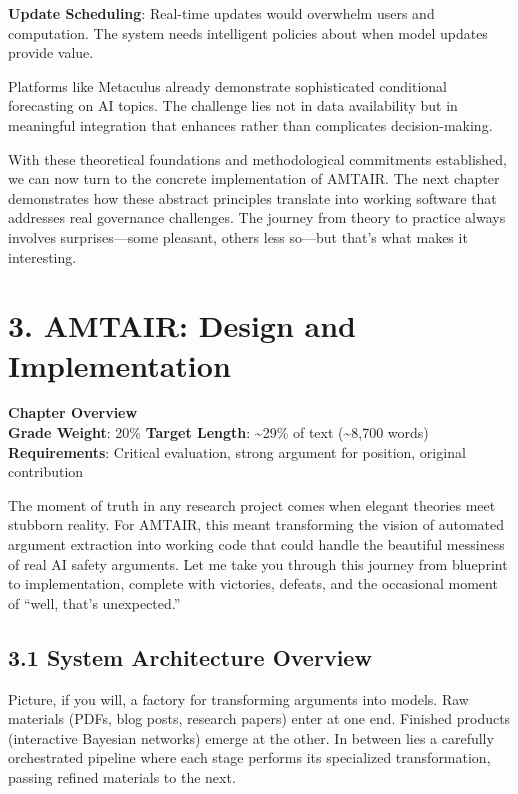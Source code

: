 \documentclass[
  11pt,
  letterpaper,
]{book}
\begin{document}
\textbf{Update Scheduling}: Real-time updates would overwhelm users and
computation. The system needs intelligent policies about when model
updates provide value.

Platforms like Metaculus \textcite{tetlock2022} already demonstrate
sophisticated conditional forecasting on AI topics. The challenge lies
not in data availability but in meaningful integration that enhances
rather than complicates decision-making.

With these theoretical foundations and methodological commitments
established, we can now turn to the concrete implementation of AMTAIR.
The next chapter demonstrates how these abstract principles translate
into working software that addresses real governance challenges. The
journey from theory to practice always involves surprises---some
pleasant, others less so---but that's what makes it interesting.


\chapter{3. AMTAIR: Design and Implementation}\label{sec-amtair}

\textbf{Chapter Overview}\\
\textbf{Grade Weight}: 20\% \textbar{} \textbf{Target Length}:
\textasciitilde29\% of text (\textasciitilde8,700 words)\\
\textbf{Requirements}: Critical evaluation, strong argument for
position, original contribution

The moment of truth in any research project comes when elegant theories
meet stubborn reality. For AMTAIR, this meant transforming the vision of
automated argument extraction into working code that could handle the
beautiful messiness of real AI safety arguments. Let me take you through
this journey from blueprint to implementation, complete with victories,
defeats, and the occasional moment of ``well, that's unexpected.''

\section{3.1 System Architecture
Overview}\label{sec-system-architecture}

Picture, if you will, a factory for transforming arguments into models.
Raw materials (PDFs, blog posts, research papers) enter at one end.
Finished products (interactive Bayesian networks) emerge at the other.
In between lies a carefully orchestrated pipeline where each stage
performs its specialized transformation, passing refined materials to
the next.
\end{document}
